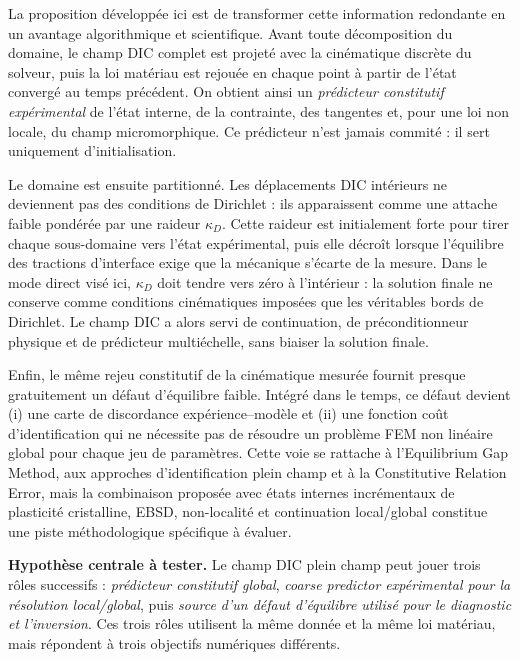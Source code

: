 \documentclass[11pt,a4paper]{article}
\begin{document}
La proposition développée ici est de transformer cette information redondante en un avantage
algorithmique et scientifique. Avant toute décomposition du domaine, le champ DIC complet est
projeté avec la cinématique discrète du solveur, puis la loi matériau est rejouée en chaque point à
partir de l'état convergé au temps précédent. On obtient ainsi un \emph{prédicteur constitutif
expérimental} de l'état interne, de la contrainte, des tangentes et, pour une loi non locale, du champ
micromorphique. Ce prédicteur n'est jamais commité : il sert uniquement d'initialisation.

Le domaine est ensuite partitionné. Les déplacements DIC intérieurs ne deviennent pas des
conditions de Dirichlet : ils apparaissent comme une attache faible pondérée par une raideur
$\kappa_D$. Cette raideur est initialement forte pour tirer chaque sous-domaine vers l'état
expérimental, puis elle décroît lorsque l'équilibre des tractions d'interface exige que la mécanique
s'écarte de la mesure. Dans le mode direct visé ici, $\kappa_D$ doit tendre vers zéro à l'intérieur :
la solution finale ne conserve comme conditions cinématiques imposées que les véritables bords de
Dirichlet. Le champ DIC a alors servi de continuation, de préconditionneur physique et de prédicteur
multiéchelle, sans biaiser la solution finale.

Enfin, le même rejeu constitutif de la cinématique mesurée fournit presque gratuitement un défaut
d'équilibre faible. Intégré dans le temps, ce défaut devient (i) une carte de discordance
expérience--modèle et (ii) une fonction coût d'identification qui ne nécessite pas de résoudre un
problème FEM non linéaire global pour chaque jeu de paramètres. Cette voie se rattache à
l'Equilibrium Gap Method, aux approches d'identification plein champ et à la Constitutive Relation
Error, mais la combinaison proposée avec états internes incrémentaux de plasticité cristalline,
EBSD, non-localité et continuation local/global constitue une piste méthodologique spécifique à
évaluer.

\begin{ideabox}
\textbf{Hypothèse centrale à tester.} Le champ DIC plein champ peut jouer trois rôles successifs :
\emph{prédicteur constitutif global}, \emph{coarse predictor expérimental pour la résolution
local/global}, puis \emph{source d'un défaut d'équilibre utilisé pour le diagnostic et l'inversion}.
Ces trois rôles utilisent la même donnée et la même loi matériau, mais répondent à trois objectifs
numériques différents.
\end{ideabox}
\end{document}
